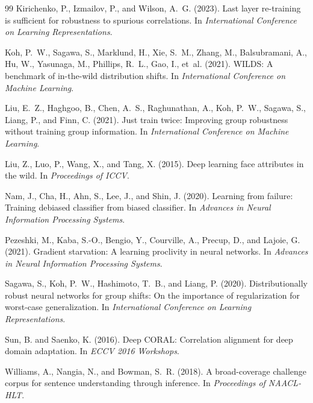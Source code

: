 \documentclass{article}
\begin{document}
\begin{thebibliography}{99}
Kirichenko, P., Izmailov, P., and Wilson, A.~G. (2023).
Last layer re-training is sufficient for robustness to spurious correlations.
In \textit{International Conference on Learning Representations}.

Koh, P.~W., Sagawa, S., Marklund, H., Xie, S.~M., Zhang, M., Balsubramani, A., Hu, W., Yasunaga, M., Phillips, R.~L., Gao, I., et~al. (2021).
WILDS: A benchmark of in-the-wild distribution shifts.
In \textit{International Conference on Machine Learning}.

Liu, E.~Z., Haghgoo, B., Chen, A.~S., Raghunathan, A., Koh, P.~W., Sagawa, S., Liang, P., and Finn, C. (2021).
Just train twice: Improving group robustness without training group information.
In \textit{International Conference on Machine Learning}.

Liu, Z., Luo, P., Wang, X., and Tang, X. (2015).
Deep learning face attributes in the wild.
In \textit{Proceedings of ICCV}.

Nam, J., Cha, H., Ahn, S., Lee, J., and Shin, J. (2020).
Learning from failure: Training debiased classifier from biased classifier.
In \textit{Advances in Neural Information Processing Systems}.

Pezeshki, M., Kaba, S.-O., Bengio, Y., Courville, A., Precup, D., and Lajoie, G. (2021).
Gradient starvation: A learning proclivity in neural networks.
In \textit{Advances in Neural Information Processing Systems}.

Sagawa, S., Koh, P.~W., Hashimoto, T.~B., and Liang, P. (2020).
Distributionally robust neural networks for group shifts: On the importance of regularization for worst-case generalization.
In \textit{International Conference on Learning Representations}.

Sun, B. and Saenko, K. (2016).
Deep CORAL: Correlation alignment for deep domain adaptation.
In \textit{ECCV 2016 Workshops}.

Williams, A., Nangia, N., and Bowman, S.~R. (2018).
A broad-coverage challenge corpus for sentence understanding through inference.
In \textit{Proceedings of NAACL-HLT}.

\end{thebibliography}
\end{document}

